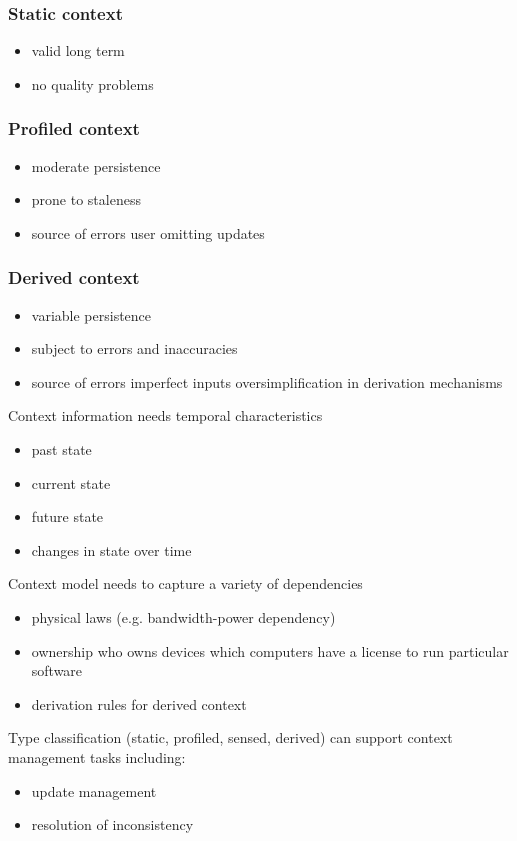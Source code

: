 \subsubsection{Static context}
\begin{itemize}
	\item valid long term
	\item no quality problems	
\end{itemize}

\subsubsection{Profiled context}
\begin{itemize}
	\item moderate persistence
	\item prone to staleness
	\item source of errors
	\subitem user omitting updates	
\end{itemize}

\subsubsection{Derived context}
\begin{itemize}
	\item variable persistence
	\item subject to errors and inaccuracies
	\item source of errors
	\subitem imperfect inputs
	\subitem oversimplification in derivation mechanisms	
\end{itemize}
\vspace{2em}

Context information needs temporal characteristics
\begin{itemize}
	\item past state
	\item current state
	\item future state
	\item changes in state over time	
\end{itemize}
Context model needs to capture a variety of dependencies
\begin{itemize}
	\item physical laws (e.g. bandwidth-power dependency)
	\item ownership
	\subitem who owns devices
	\subitem which computers have a license to run particular software
	\item derivation rules
	\subitem for derived context	
\end{itemize}
Type classification (static, profiled, sensed, derived) can support context management tasks including:
\begin{itemize}
	\item update management
	\item resolution of inconsistency	
\end{itemize}

